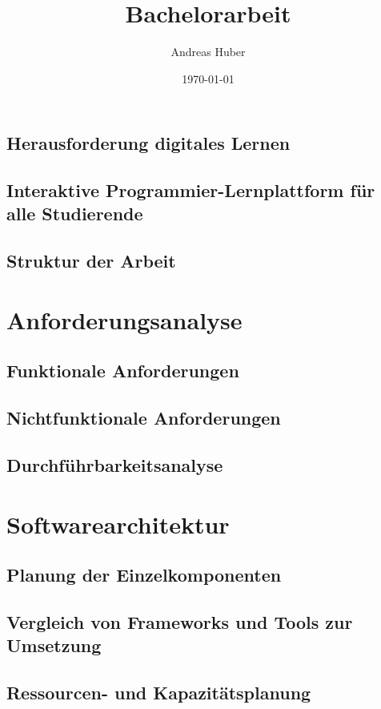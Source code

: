 \documentclass[a4paper,12pt,headsepline]{article}
\title{Bachelorarbeit}
\author{Andreas Huber}
\date{\today}
\begin{document}

\newpage


\tableofcontents
\newpage



\subsection{Herausforderung digitales Lernen}
\subsection{Interaktive Programmier-Lernplattform für alle Studierende}
\subsection{Struktur der Arbeit}



\section{Anforderungsanalyse}
\subsection{Funktionale Anforderungen}
\subsection{Nichtfunktionale Anforderungen}
\subsection{Durchführbarkeitsanalyse}
\section{Softwarearchitektur}
\subsection{Planung der Einzelkomponenten}
\subsection{Vergleich von Frameworks und Tools zur Umsetzung}
\subsection{Ressourcen- und Kapazitätsplanung}
\end{document}
